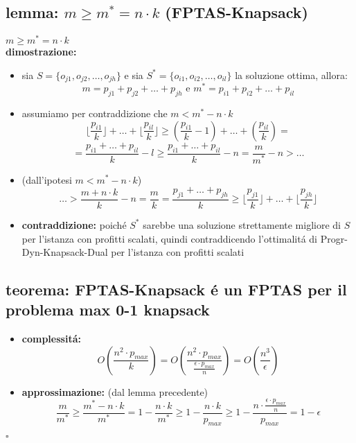 \subsection*{lemma: $m\geq m^*=n\cdot k$ (FPTAS-Knapsack)}
\begin{flushleft}
	$m\geq m^*=n\cdot k$ \newline \\
	\textbf{dimostrazione:}
	\begin{itemize}
		\item sia $S=\{o_{j1},o_{j2},\ldots,o_{jh}\}$ e sia $S^*=\{o_{i1},o_{i2},\ldots,o_{il}\}$ la soluzione ottima, allora:
			$$m=p_{j1}+p_{j2}+\ldots+p_{jh}\text{ e }m^*=p_{i1}+p_{i2}+\ldots+p_{il}$$
		\item assumiamo per contraddizione che $m<m^*-n\cdot k$
			$$\lfloor\frac{p_{i1}}{k}\rfloor+\ldots+\lfloor\frac{p_{il}}{k}\rfloor\geq(\frac{p_{i1}}{k}-1)+\ldots+(\frac{p_{il}}{k})=$$
			$$=\frac{p_{i1}+\ldots+p_{il}}{k}-l\geq\frac{p_{i1}+\ldots+p_{il}}{k}-n=\frac{m}{m^*}-n>\ldots$$
		\item (dall'ipotesi $m<m^*-n\cdot k$)
			$$\ldots>\frac{m+n\cdot
			k}{k}-n=\frac{m}{k}=\frac{p_{j1}+\ldots+p_{jh}}{k}\geq\lfloor\frac{p_{j1}}{k}\rfloor+\ldots+\lfloor\frac{p_{jh}}{k}\rfloor$$
		\item \textbf{contraddizione:} poich\'e $S^*$ sarebbe una soluzione strettamente migliore di $S$ per l'istanza con profitti scalati, quindi contraddicendo l'ottimalit\'a di Progr-Dyn-Knapsack-Dual per l'istanza con profitti scalati
	\end{itemize}
\end{flushleft}


\subsection*{teorema: FPTAS-Knapsack \'e un FPTAS per il problema max 0-1 knapsack}
\begin{flushleft}
	\begin{itemize}
		\item \textbf{complessit\'a:}
			$$O(\frac{n^2\cdot p_{max}}{k})=O(\frac{n^2\cdot p_{max}}{\frac{\epsilon\cdot
			p_{max}}{n}})=O(\frac{n^3}{\epsilon})$$
		\item \textbf{approssimazione:} (dal lemma precedente)
			$$\frac{m}{m^*}\geq\frac{m^*-n\cdot k}{m^*}=1-\frac{n\cdot k}{m^*}\geq1-\frac{n\cdot k}{p_{max}}\geq 1-\frac{n\cdot\frac{\epsilon\cdot p_{max}}{n}}{p_{max}}=1-\epsilon$$
	\end{itemize}
	\hfill$\square$
\end{flushleft}

